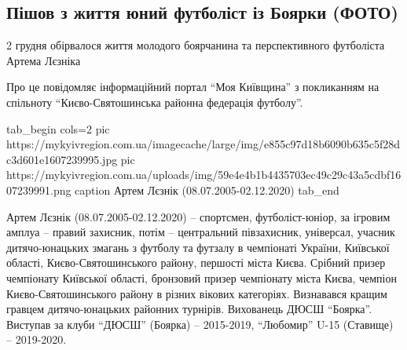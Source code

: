  
 
 
 
 
 
\subsection{Пішов з життя юний футболіст із Боярки (ФОТО)}
\label{sec:06_12_2020.news.ua.mykyivregion.1.bojarka_junyy_futbolist}

2 грудня обірвалося життя молодого боярчанина та перспективного футболіста Артема Лєзніка

Про це повідомляє інформаційний портал \enquote{Моя Київщина} з покликанням на
спільноту \enquote{Києво-Святошинська районна федерація футболу}.

\ifcmt
tab_begin cols=2
pic https://mykyivregion.com.ua/imagecache/large/img/e855c97d18b6090b635c5f28dc3d601e1607239995.jpg
pic https://mykyivregion.com.ua/uploads/img/59e4e4b1b4435703ec49c29c43a5cdbf1607239991.png
caption Артем Лєзнік (08.07.2005-02.12.2020)
tab_end
\fi

Артем Лєзнік (08.07.2005-02.12.2020) – спортсмен, футболіст-юніор, за ігровим
амплуа – правий захисник, потім – центральний півзахисник, універсал, учасник
дитячо-юнацьких  змагань з футболу та футзалу в чемпіонаті України, Київської
області, Києво-Святошинського району, першості міста Києва. Срібний призер
чемпіонату Київської області, бронзовий призер чемпіонату міста Києва, чемпіон
Києво-Святошинського району в різних вікових категоріях. Визнавався кращим
гравцем дитячо-юнацьких районних турнірів. Вихованець ДЮСШ \enquote{Боярка}. Виступав
за клуби \enquote{ДЮСШ} (Боярка) – 2015-2019, \enquote{Любомир} U-15 (Ставище) – 2019-2020.

